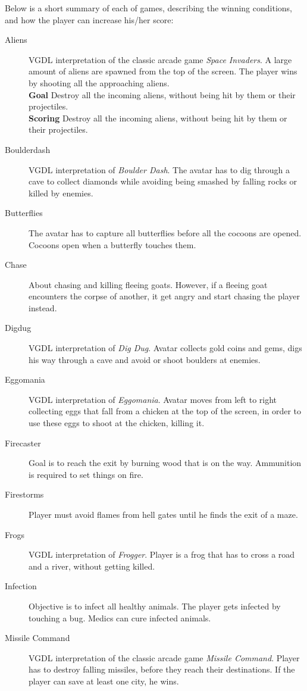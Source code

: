 \documentclass[a4paper,titlepage,final, twoside]{report}
\begin{document}
Below is a short summary of each of games, describing the winning conditions, and how the player can increase his/her score:
\begin{description}
\item [Aliens] VGDL interpretation of the classic arcade game \emph{Space Invaders}. A large amount of aliens are spawned from the top of the screen. The player wins by shooting all the approaching aliens.\\
\textbf{Goal} Destroy all the incoming aliens, without being hit by them or their projectiles.\\
\textbf{Scoring} Destroy all the incoming aliens, without being hit by them or their projectiles.
\item [Boulderdash] VGDL interpretation of \emph{Boulder Dash}. The avatar has to dig through a cave to collect diamonds while avoiding being smashed by falling rocks or killed by enemies. 
\item [Butterflies] The avatar has to capture all butterflies before all the cocoons are opened. Cocoons open when a butterfly touches them.
\item [Chase] About chasing and killing fleeing goats. However, if a fleeing goat encounters the corpse of another, it get angry and start chasing the player instead.
\item [Digdug] VGDL interpretation of \emph{Dig Dug}. Avatar collects gold coins and gems, digs his way through a cave and avoid or shoot boulders at enemies.
\item [Eggomania] VGDL interpretation of \emph{Eggomania}. Avatar moves from left to right collecting eggs that fall from a chicken at the top of the screen, in order to use these eggs to shoot at the chicken, killing it.
\item [Firecaster] Goal is to reach the exit by burning wood that is on the way. Ammunition is required to set things on fire.
\item [Firestorms] Player must avoid flames from hell gates until he finds the exit of a maze.
\item [Frogs] VGDL interpretation of \emph{Frogger}. Player is a frog that has to cross a road and a river, without getting killed.
\item [Infection] Objective is to infect all healthy animals. The player gets infected by touching a bug. Medics can cure infected animals.
\item [Missile Command] VGDL interpretation of the classic arcade game \emph{Missile Command}. Player has to destroy falling missiles, before they reach their destinations. If the player can save at least one city, he wins.

\end{description}
\end{document}
